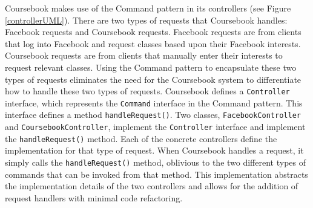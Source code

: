 Coursebook makes use of the  Command pattern in its controllers (see
Figure \ref{controllerUML}). There are two types of requests that Coursebook
handles: Facebook requests and Coursebook requests. Facebook requests are from
clients that log into Facebook and request classes based upon their Facebook 
interests. Coursebook requests are from clients that manually enter their 
interests to request relevant classes. Using the Command pattern to encapsulate
these two types of requests eliminates the need for the Coursebook system to 
differentiate how to handle these two types of requests. Coursebook defines a
\texttt{Controller} interface, which represents the \texttt{Command} interface 
in the Command pattern. This interface defines a method
\texttt{handleRequest()}. Two classes, \texttt{FacebookController} and
\texttt{CoursebookController}, implement the \texttt{Controller} interface and
implement the \texttt{handleRequest()} method. Each of the concrete controllers
define the implementation for that type of request. When Coursebook handles a
request, it simply calls the \texttt{handleRequest()} method, oblivious to the 
two different types of commands that can be invoked from that method. This 
implementation abstracts the implementation details of the two controllers and
allows for the addition of request handlers with minimal code refactoring.
